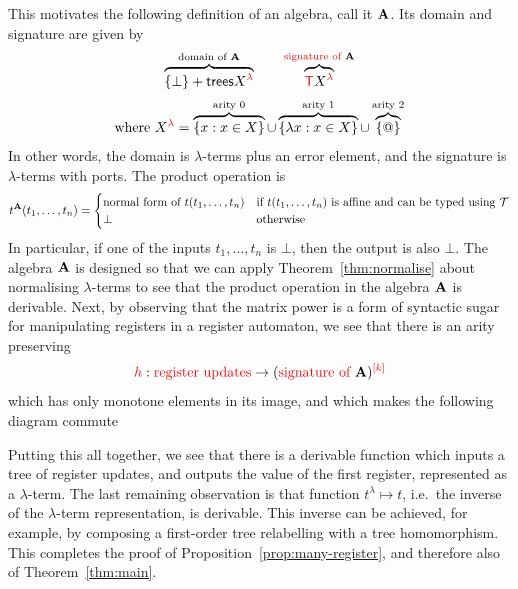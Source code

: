 This motivates the  following definition of an algebra, call it $\alg$. Its domain and signature are given by 
\begin{align*}
\overbrace{\set \bot + \trees \lamrank X}^{\algdom \alg}  \qquad \overbrace{ \tmonad \lamrank X}^{\algops \alg} 
\end{align*}
\begin{align*}
\text{where }\lamrank X = {\overbrace{\set{x : x \in X}}^{\text{arity 0}} \cup \overbrace{\set{\lambda x : x \in X}}^{\text{arity 1}} \cup  \overbrace{\set @}^{\text{arity 2}}}
\end{align*}
In other words, the domain is $\lambda$-terms plus an error element, and the signature is $\lambda$-terms  with ports. The   product operation is 
\begin{align*}
t^\alg(t_1,\ldots,t_n) = \begin{cases}
    \text{normal form of $t(t_1,\ldots,t_n)$} & \text{if $t(t_1,\ldots,t_n)$ is affine and can be typed using $\Tt$}\\
    \bot & \text{otherwise}
\end{cases}
\end{align*}
In particular, if one of the inputs $t_1,\ldots,t_n$ is $\bot$, then the output is also $\bot$.  The algebra $\alg$ is designed so that we can apply Theorem~\ref{thm:normalise} about normalising $\lambda$-terms to see that the  product operation in the  algebra $\alg$ is derivable. Next, by observing that the matrix power is a form of syntactic sugar for manipulating registers in a register automaton, we see that there is an arity preserving 
    \begin{align*}
    \ranked h : \regups \to \mati k {(\algops \alg)}
    \end{align*}
    which has only monotone elements in its image, and which makes the following diagram commute


Putting this all together, we see that there is a derivable function which inputs a tree of register updates, and outputs the value of the first register, represented as a $\lambda$-term. The last remaining observation is that function $t^\lambda \mapsto t$, i.e.~the inverse of the $\lambda$-term representation, is derivable. This inverse can be achieved, for example, by composing a first-order tree relabelling with a tree homomorphism. This completes the proof of Proposition~\ref{prop:many-register}, and therefore also of Theorem~\ref{thm:main}. 